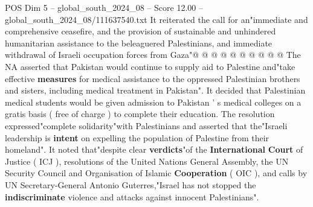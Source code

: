 \begin{textsample}{POS Dim 5 – global\_south\_2024\_08 – Score 12.00 – global\_south\_2024\_08/111637540.txt}
It reiterated the call for an"immediate and comprehensive ceasefire, and the provision of sustainable and unhindered humanitarian assistance to the beleaguered Palestinians, and immediate withdrawal of Israeli occupation forces from Gaza"@ @ @ @ @ @ @ @ @ @ The NA asserted that Pakistan would continue to supply aid to Palestine and"take effective \textbf{measures} for medical assistance to the oppressed Palestinian brothers and sisters, including medical treatment in Pakistan".
It decided that Palestinian medical students would be given admission to Pakistan ' s medical colleges on a gratis basis ( free of charge ) to complete their education.
The resolution expressed"complete solidarity"with Palestinians and asserted that the"Israeli leadership is \textbf{intent} on expelling the population of Palestine from their homeland".
It noted that"despite clear \textbf{verdicts}"of the \textbf{International} \textbf{Court} of Justice ( ICJ ), resolutions of the United Nations General Assembly, the UN Security Council and Organisation of Islamic \textbf{Cooperation} ( OIC ), and calls by UN Secretary-General Antonio Guterres,"Israel has not stopped the \textbf{indiscriminate} violence and attacks against innocent Palestinians".

\end{textsample}
